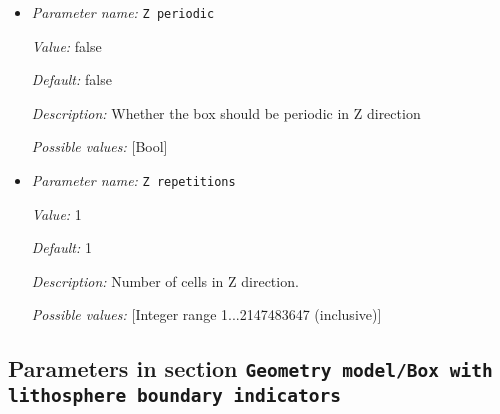 \begin{itemize}
{\it Value:} 1


{\it Default:} 1


{\it Description:} Extent of the box in z-direction. This value is ignored if the simulation is in 2d. Units: m.


{\it Possible values:} [Double 0...1.79769e+308 (inclusive)]
\item {\it Parameter name:} {\tt Z periodic}
\label{parameters:Geometry model/Box/Z periodic}


{\it Value:} false


{\it Default:} false


{\it Description:} Whether the box should be periodic in Z direction


{\it Possible values:} [Bool]
\item {\it Parameter name:} {\tt Z repetitions}
\label{parameters:Geometry model/Box/Z repetitions}


{\it Value:} 1


{\it Default:} 1


{\it Description:} Number of cells in Z direction.


{\it Possible values:} [Integer range 1...2147483647 (inclusive)]
\end{itemize}

\subsection{Parameters in section \tt Geometry model/Box with lithosphere boundary indicators}
\label{parameters:Geometry_20model/Box_20with_20lithosphere_20boundary_20indicators}

